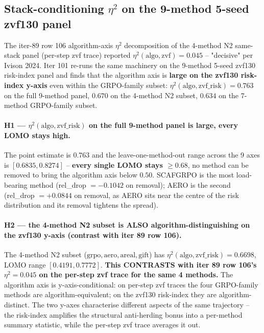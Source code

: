 \subsection{Stack-conditioning \texorpdfstring{$\eta^2$}{eta\textasciicircum 2} on the 9-method 5-seed zvf130 panel}
\label{sec:p5-iter101-zvf130-eta2}

The iter-89 row 106 algorithm-axis $\eta^2$ decomposition of the
4-method N2 same-stack panel (per-step zvf trace) reported
$\eta^2(\mathrm{algo}, \mathrm{zvf}) = 0.045$ -- "decisive" per Ivison
2024. Iter 101 re-runs the same machinery on the 9-method 5-seed
zvf130 risk-index panel and finds that the algorithm axis is
\textbf{large on the zvf130 risk-index y-axis} even within the
GRPO-family subset:
$\eta^2(\mathrm{algo}, \mathrm{zvf\_risk}) = 0.763$ on the full
9-method panel, $0.670$ on the 4-method N2 subset, $0.634$ on the
7-method GRPO-family subset.

\paragraph{H1 --- $\eta^2(\mathrm{algo}, \mathrm{zvf\_risk})$ on the
full 9-method panel is large, every LOMO stays high.}
The point estimate is $0.763$ and the leave-one-method-out range
across the 9 axes is $[0.6835, 0.8274]$ -- \textbf{every single LOMO
stays $\geq 0.68$}, no method can be removed to bring the algorithm
axis below $0.50$. SCAFGRPO is the most load-bearing method
(rel\_drop $= -0.1042$ on removal); AERO is the second
(rel\_drop $= +0.0844$ on removal, as AERO sits near the centre of
the risk distribution and its removal tightens the spread).

\paragraph{H2 --- the 4-method N2 subset is ALSO algorithm-distinguishing
on the zvf130 y-axis (contrast with iter 89 row 106).}
The 4-method N2 subset ($\mathrm{grpo, aero, areal, gift}$)
has $\eta^2(\mathrm{algo}, \mathrm{zvf\_risk}) = 0.6698$, LOMO range
$[0.4191, 0.7772]$. \textbf{This CONTRASTS with iter 89 row 106's
$\eta^2 = 0.045$ on the per-step zvf trace for the same 4 methods.}
The algorithm axis is y-axis-conditional: on per-step zvf traces
the four GRPO-family methods are algorithm-equivalent; on the
zvf130 risk-index they are algorithm-distinct. The two y-axes
characterise different aspects of the same trajectory -- the
risk-index amplifies the structural anti-herding bonus into a
per-method summary statistic, while the per-step zvf trace averages
it out.


